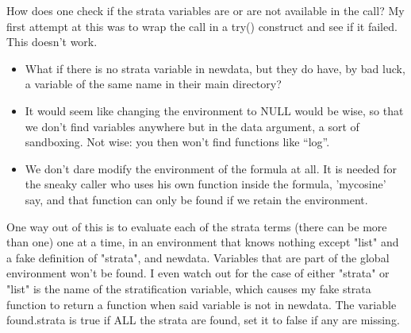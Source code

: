 \documentclass{article}
\begin{document}
How does one check if the strata variables are or are not available in
the call?
My first attempt at this was to wrap the call in a try() construct and
see if it failed.  This doesn't work. 
\begin{itemize}
  \item What if there is no strata variable in newdata, but they do have, 
    by bad luck, a variable of the same name in their main directory?
  \item It would seem like changing the environment to NULL would be wise,
    so that we don't find variables anywhere but in the data argument,
    a sort of sandboxing.  Not wise: you then won't find functions like ``log''.
  \item We don't dare modify the environment of the formula at all.
    It is needed for the sneaky caller who uses his own function
    inside the formula, 'mycosine' say, and that function can only be 
    found if we retain the environment.  
\end{itemize}
One way out of this is to evaluate each of the strata terms
(there can be more than one) one at a time, in an environment that knows
nothing except "list" and a fake definition of "strata", and newdata.
Variables that are part of the global environment won't be found.
I even watch out for the case of either "strata" or "list" is the name of
the stratification variable, which causes my fake strata function to 
return a function when said variable is not in newdata. The
variable found.strata is true if ALL the strata are found, set it to
false if any are missing.

\end{document}
